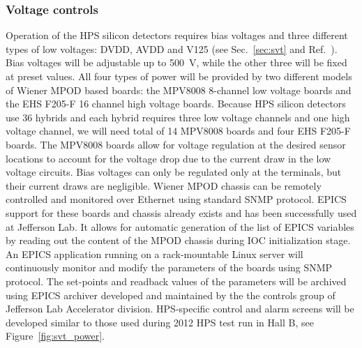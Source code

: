 \subsubsection{Voltage controls}
\label{sec:ctrls:voltage}
Operation of the HPS silicon detectors requires bias voltages and three different types of low voltages: DVDD, 
AVDD and V125 (see Sec.~\ref{sec:svt} and Ref.~\cite{HPS_PROP}). Bias voltages will be adjustable up to 
500~\textmd{V}, while the other three will be fixed  at preset values. All four types of power  
will be provided by two different models of Wiener MPOD based boards: the MPV8008 8-channel low voltage boards and 
the EHS F205-F 16 channel high voltage boards. Because HPS silicon detectors use 36 hybrids and each hybrid requires 
three low voltage channels and one high voltage channel, we will need total of 14 MPV8008 boards and four EHS F205-F boards. 
The MPV8008 boards allow for voltage regulation at the desired sensor locations to account for the voltage drop due to the 
current draw in the low voltage circuits. Bias voltages can only be regulated only at the terminals, 
but their current draws are negligible. Wiener MPOD chassis can be remotely controlled and monitored over Ethernet using 
standard SNMP protocol. EPICS support for these boards and chassis already exists and has been successfully used at Jefferson Lab. 
It allows for automatic generation of the list of EPICS variables  by reading out the content of the MPOD chassis 
during IOC initialization stage. An EPICS application running on a rack-mountable Linux server will  
continuously monitor and modify the parameters of the boards using SNMP protocol.  
The set-points and readback values of the parameters will be archived using EPICS archiver developed and maintained 
by the the controls group of Jefferson Lab Accelerator division. 
HPS-specific control and alarm screens will be developed similar to those used during 2012 HPS test run in 
Hall B, see Figure~\ref{fig:svt_power}. 
  
